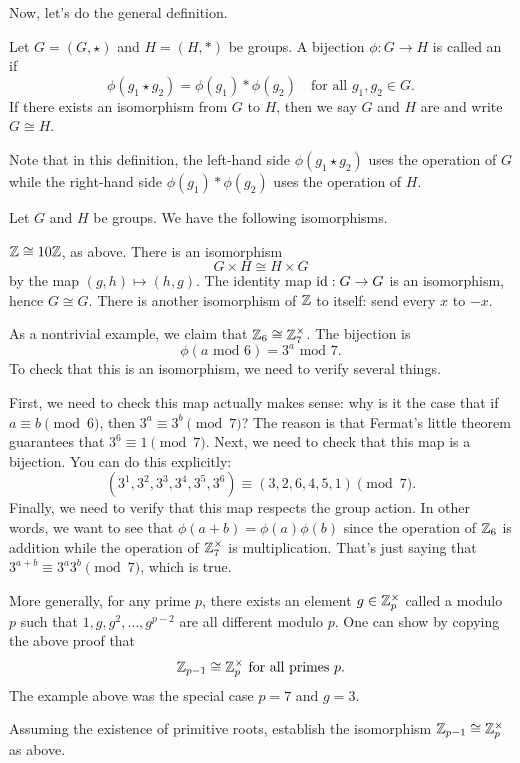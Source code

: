Now, let's do the general definition.
\begin{definition}
	Let $G = (G, \star)$ and $H = (H, \ast)$ be groups.
	A bijection $\phi : G \to H$ is called an  if
	\[ \phi(g_1 \star g_2) = \phi(g_1) \ast \phi(g_2) \quad
		\text{for all $g_1, g_2 \in G$}. \]
	If there exists an isomorphism from $G$ to $H$,
	then we say $G$ and $H$ are  and write $G \cong H$.
\end{definition}
Note that in this definition, the left-hand side
$\phi(g_1 \star g_2)$ uses the operation of $G$
while the right-hand side $\phi(g_1) \ast \phi(g_2)$
uses the operation of $H$.

\begin{example}
	Let $G$ and $H$ be groups. We have the following isomorphisms.
	\begin{enumerate}[(a)]
		\ii $\mathbb Z \cong 10 \mathbb Z$, as above.
		\ii There is an isomorphism
		\[ G \times H \cong H \times G\]
		by the map $(g,h) \mapsto (h,g)$.
		\ii The identity map $\mathrm{id} : G \to G$
		is an isomorphism, hence $G \cong G$.
		\ii There is another isomorphism of $\mathbb Z$ to itself: send every $x$ to $-x$.
	\end{enumerate}
\end{example}
\begin{example}
	As a nontrivial example, we claim that $\mathbb Z_{6} \cong \mathbb Z_{7}^\times$.
	The bijection is
	\[ \phi(\text{$a$ mod $6$}) = \text{$3^a$ mod $7$}. \]
	To check that this is an isomorphism, we need to verify several things.
	\begin{itemize}
		\ii First, we need to check this map actually makes sense:
		why is it the case that if $a \equiv b \pmod 6$, then $3^a \equiv 3^b \pmod 7$?
		The reason is that Fermat's little theorem guarantees that $3^6 \equiv 1 \pmod 7$.
		\ii Next, we need to check that this map is a bijection.
		You can do this explicitly:
		\[ (3^1, 3^2, 3^3, 3^4, 3^5, 3^6)
			\equiv (3,2,6,4,5,1) \pmod 7. \]
		\ii Finally, we need to verify that this map respects the group action.
		In other words, we want to see that
		$\phi(a+b) = \phi(a) \phi(b)$
		since the operation of $\mathbb Z_{6}$ is addition
		while the operation of $\mathbb Z_{7}^\times$ is multiplication.
		That's just saying that $3^{a+b} \equiv 3^a 3^b \pmod 7$,
		which is true.
	\end{itemize}
\end{example}
\begin{example}
	More generally, for any prime $p$, there exists
	an element $g \in \mathbb Z_{p}^\times$ called a  modulo $p$
	such that $1, g, g^2, \dots, g^{p-2}$ are all different modulo $p$.
	One can show by copying the above proof that
	\[ \mathbb Z_{p-1} \cong \mathbb Z_{p}^\times \text{ for all primes $p$}. \]
	The example above was the special case $p=7$ and $g=3$.
\end{example}
\begin{exercise}
	Assuming the existence of primitive roots,
	establish the isomorphism $\mathbb Z_{p-1} \cong \mathbb Z_{p}^\times$ as above.
\end{exercise}

